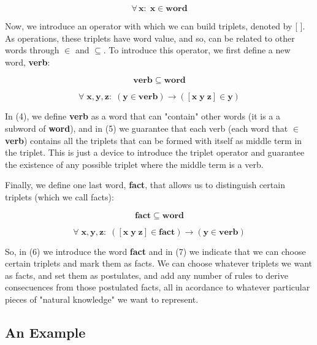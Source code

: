 \documentclass{IOS-Book-Article}     %
\begin{document}
\begin{equation}
\forall\,\mathbf{x:\;x\in word}
\end{equation}

Now, we introduce an operator with which we can build triplets, denoted by [ ].
As operations, these triplets have word value, and so, can be related to
other words through $\in$ and $\subseteq$. To introduce this operator,
we first define a new word, \textbf{verb}:

\begin{equation}
\mathbf{verb\subseteq word}
\end{equation}

\begin{equation}
\forall\;\mathbf{x\mathrm{,\mathbf{y\mathrm{,\mathbf{z}:\;\mathbf{\left(\mathbf{y\in\mathbf{verb}}\right)\rightarrow\left(\left[\mathbf{x\; y\; z}\right]\in y\right)}}}}}
\end{equation}

In (4), we define \textbf{verb} as a word that can "contain" other words
(it is a a subword of \textbf{word}), and in (5) we guarantee that each verb
(each word that $\in$ \textbf{verb}) contains all the triplets that can be
formed with itself as middle term in the triplet. This is just a device to
introduce the triplet operator and guarantee the existence of
any possible triplet where the middle term is a verb.

Finally, we define one last word, \textbf{fact}, that allows us to distinguish
certain triplets (which we call facts):

\begin{equation}
\mathbf{fact\subseteq word}
\end{equation}

\begin{equation}
\forall\;\mathbf{x\mathrm{,\mathbf{y\mathrm{,\mathbf{z}:\;\left(\left[\mathbf{x\; y\; z}\right]\in \mathbf{fact}\right)}\mathbf\rightarrow\left(\mathbf{y\in\mathbf{verb}}\right)}}}
\end{equation}

So, in (6) we introduce the word \textbf{fact}
and in (7) we indicate that we can choose certain triplets and mark
them as facts. We can choose whatever triplets we want as facts,
and set them as postulates, and add any number of rules
to derive consecuences from those postulated facts,
all in acordance to whatever particular pieces of "natural knowledge"
we want to represent.

\subsection{An Example}
\end{document}
